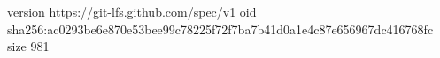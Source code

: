 version https://git-lfs.github.com/spec/v1
oid sha256:ac0293be6e870e53bee99c78225f72f7ba7b41d0a1e4c87e656967dc416768fc
size 981
